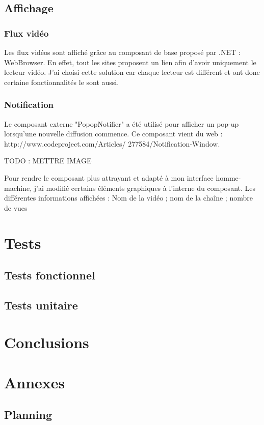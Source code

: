 \documentclass[11pt]{report} %
\begin{document}
	\newpage
	\section{Affichage}
		\subsection{Flux vidéo}
		Les flux vidéos sont affiché grâce au composant de base proposé par .NET : WebBrowser. En effet, tout les sites proposent un lien afin d'avoir uniquement le lecteur vidéo.
		J'ai choisi cette solution car chaque lecteur est différent et ont donc certaine fonctionnalités le sont aussi.
		
		
		\subsection{Notification}
		Le composant externe "PopopNotifier" a été utilisé pour afficher un pop-up lorsqu’une nouvelle
		diffusion commence. Ce composant vient du web : http://www.codeproject.com/Articles/
		277584/Notification-Window.
		
		TODO : METTRE IMAGE
		
		Pour rendre le composant plus attrayant et adapté à mon interface homme-machine, j’ai modifié
		certains éléments graphiques à l'interne du composant.
		Les différentes informations affichées : Nom de la vidéo ; nom de la chaîne ; nombre de vues	
		
	
\chapter{Tests}
	\section{Tests fonctionnel}
	\section{Tests unitaire}
	
\chapter{Conclusions}

\chapter{Annexes}
	\section{Planning}
\end{document}
